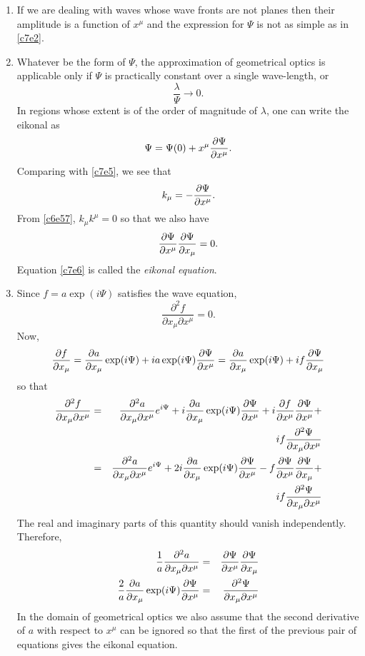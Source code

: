 \begin{enumerate}
\item If we are dealing with waves whose wave fronts are not planes then their
amplitude is a function of $x^\mu$ and the expression for $\Psi$ is not as 
simple as in \eqref{c7e2}.

\item Whatever be the form of $\Psi$, the approximation of geometrical optics
is applicable only if $\Psi$ is practically constant over a single wave-length, or
\begin{equation}\label{c7e3}
\frac{\lambda}{\Psi} \rightarrow 0.
\end{equation} 
In regions whose extent is of the order of magnitude of $\lambda$, one can write
the eikonal as 
\begin{equation}\label{c7e4}
\Psi = \Psi(0) + x^\mu\frac{\partial{\Psi}}{\partial{x^\mu}}.
\end{equation}
Comparing with \eqref{c7e5}, we see that
\begin{equation}\label{c7e5}
k_\mu = -\frac{\partial{\Psi}}{\partial{x^\mu}}.
\end{equation}
From \eqref{c6e57}, $k_\mu k^\mu = 0$ so that we also have
\begin{equation}\label{c7e6}
\frac{\partial{\Psi}}{\partial{x^\mu}}\frac{\partial{\Psi}}{\partial{x_\mu}} = 0.
\end{equation}
Equation \eqref{c7e6} is called the \emph{eikonal equation}.

\item Since $f = a\exp(i\Psi)$ satisfies the wave equation, 
\[
\frac{\partial^2 f}{\partial x_\mu \partial x^\mu} = 0.
\]
Now,
\[
\frac{\partial{f}}{\partial{x_\mu}} = \frac{\partial{a}}{\partial{x_\mu}}\exp(i\Psi) + ia\exp(i\Psi)\frac{\partial{\Psi}}{\partial{x^\mu}} =
\frac{\partial{a}}{\partial{x_\mu}}\exp(i\Psi) + if\frac{\partial{\Psi}}{\partial{x_\mu}}
\]
so that
\begin{eqnarray*}
\frac{\partial^2 f}{\partial x_\mu \partial x^\mu} &=& 
    \frac{\partial^2 a}{\partial x_\mu \partial x^\mu}e^{i\Psi} + 
    i\frac{\partial{a}}{\partial{x_\mu}}\exp(i\Psi)\frac{\partial{\Psi}}{\partial{x^\mu}} + i\frac{\partial{f}}{\partial{x^\mu}}\frac{\partial{\Psi}}{\partial{x^\mu}} + \\
 & & if\frac{\partial^2 \Psi}{\partial x_\mu \partial x^\mu} \\
 &=& \frac{\partial^2 a}{\partial x_\mu \partial x^\mu}e^{i\Psi} + 
    2i\frac{\partial{a}}{\partial{x_\mu}}\exp(i\Psi)\frac{\partial{\Psi}}{\partial{x^\mu}} -f\frac{\partial{\Psi}}{\partial{x^\mu}}\frac{\partial{\Psi}}{\partial{x_\mu}} + \\
 & &  if\frac{\partial^2 \Psi}{\partial x_\mu \partial x^\mu}
\end{eqnarray*}
The real and imaginary parts of this quantity should vanish independently. 
Therefore,
\begin{eqnarray}
\frac{1}{a}\frac{\partial^2 a}{\partial x_\mu \partial x^\mu} &=& 
  \frac{\partial{\Psi}}{\partial{x^\mu}}\frac{\partial{\Psi}}{\partial{x_\mu}} \label{c7e7} \\
\frac{2}{a}\frac{\partial{a}}{\partial{x_\mu}}\exp(i\Psi)\frac{\partial{\Psi}}{\partial{x^\mu}} &=& 
\frac{\partial^2 \Psi}{\partial x_\mu \partial x^\mu} \label{c7e8} 
\end{eqnarray}
In the domain of geometrical optics we also assume that the second derivative of
$a$ with respect to $x^\mu$ can be ignored so that the first of the previous pair
of equations gives the eikonal equation.


\end{enumerate}
